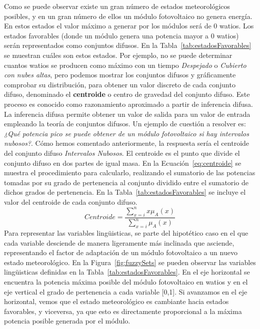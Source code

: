 Como se puede observar existe un gran número de estados meteorológicos posibles, y en un gran número de ellos un módulo fotovoltaico no genera energía. En estos estados el valor máximo a generar por los módulos será de 0 watios. Los estados favorables (donde un módulo genera una potencia mayor a 0 watios) serán representados como conjuntos difusos. En la Tabla~\ref{tab:estadosFavorables} se muestran cuáles son estos estados. Por ejemplo, no se puede determinar cuantos watios se producen como máximo con un tiempo \textit{Despejado} o \textit{Cubierto con nubes altas}, pero podemos mostrar los conjuntos difusos y gráficamente comprobar su distribución, para obtener un valor discreto de cada conjunto difuso, denominado el \textbf{centroide} o centro de gravedad del conjunto difuso. Este proceso es conocido como razonamiento aproximado a partir de inferencia difusa. La inferencia difusa permite obtener un valor de salida para un valor de entrada empleando la teoría de conjuntos difusos. Un ejemplo de cuestión a resolver es: \textit{¿Qué potencia pico se puede obtener de un módulo fotovoltaico si hay intervalos nubosos?}. Cómo hemos comentado anteriormente, la respuesta sería el centroide del conjunto difuso \textit{Intervalos Nubosos}. El centroide es el punto que divide el conjunto difuso en dos partes de igual masa. En la Ecuación~\ref{eq:centroide} se muestra el procedimiento para calcularlo, realizando el sumatorio de las potencias tomadas por su grado de pertenencia al conjunto dividido entre el sumatorio de dichos grados de pertenencia. En la Tabla~\ref{tab:estadosFavorables} se incluye el valor del centroide de cada conjunto difuso.\\
\begin{equation}
        \label{eq:centroide}
        Centroide = \frac{\sum_{x=i}^{n} x \mu_{A}(x)}{\sum_{x=i}^{n} \mu_{A}(x)}
\end{equation}
Para representar las variables lingüisticas, se parte del hipotético caso en el que cada variable desciende de manera ligeramente más inclinada que asciende, representando el factor de adaptación de un módulo fotovoltaico a un nuevo estado meteorológico. En la Figura~\ref{fig:fuzzySets} se pueden observar las variables lingüisticas definidas en la Tabla~\ref{tab:estadosFavorables}. En el eje horizontal se encuentra la potencia máxima posible del módulo fotovoltaico en watios y en el eje vertical el grado de pertenencia a cada variable [0,1]. Si avanzamos en el eje horizontal, vemos que el estado meteorológico es cambiante hacia estados favorables, y viceversa, ya que esto es directamente proporcional a la máxima potencia posible generada por el módulo.

